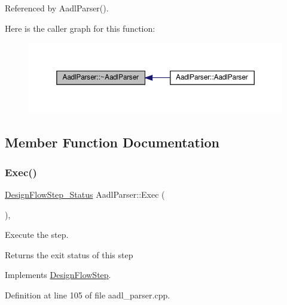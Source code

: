 Referenced by Aadl\+Parser().

Here is the caller graph for this function\+:
\nopagebreak
\begin{figure}[H]
\begin{center}
\leavevmode
\includegraphics[width=350pt]{db/daa/classAadlParser_ae24dea5fda2320c5a3dd44807557a1ed_icgraph}
\end{center}
\end{figure}


\subsection{Member Function Documentation}
\mbox{\label{classAadlParser_aded0aad8f9b66318957f0df1d027256b}} 
\subsubsection{\texorpdfstring{Exec()}{Exec()}}
{\footnotesize\ttfamily \hyperlink{design__flow__step_8hpp_afb1f0d73069c26076b8d31dbc8ebecdf}{Design\+Flow\+Step\+\_\+\+Status} Aadl\+Parser\+::\+Exec (\begin{DoxyParamCaption}{ }\end{DoxyParamCaption})\hspace{0.3cm}{\ttfamily [override]}, {\ttfamily [virtual]}}



Execute the step. 

\begin{DoxyReturn}{Returns}
the exit status of this step 
\end{DoxyReturn}


Implements \hyperlink{classDesignFlowStep_a77d7e38493016766098711ea24f60b89}{Design\+Flow\+Step}.



Definition at line 105 of file aadl\+\_\+parser.\+cpp.



